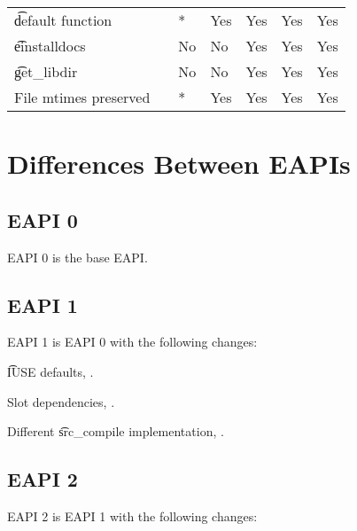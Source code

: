\begin{landscape}
\begin{longtable}{llP{7.5em}P{7.5em}P{7.5em}P{7.5em}P{7.5em}}
\t{default} function &  &
    * & Yes & Yes & Yes & Yes \\

\t{einstalldocs} &  &
    No & No & Yes & Yes & Yes \\

\t{get_libdir} &  &
    No & No & Yes & Yes & Yes \\

File mtimes preserved &  &
    * & Yes & Yes & Yes & Yes \\

\end{longtable}
\end{landscape}

\chapter{Differences Between EAPIs}


\section{EAPI 0}

EAPI 0 is the base EAPI.

\section{EAPI 1}

EAPI 1 is EAPI 0 with the following changes:

\begin{compactitem}
\item \t{IUSE} defaults, .
\item Slot dependencies, .
\item Different \t{src_compile} implementation, .
\end{compactitem}

\section{EAPI 2}

EAPI 2 is EAPI 1 with the following changes:

